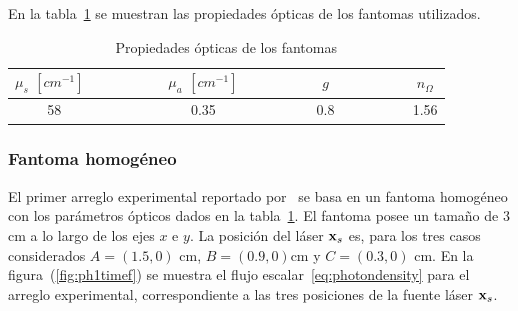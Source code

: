  En la tabla~\ref{tab:tabopt} se muestran las propiedades ópticas 
 de los fantomas utilizados.
 
 \begin{table}[h!]
\caption{Propiedades ópticas de los fantomas}
\vspace{-0.6cm}
\begin{center}
\begin{tabular}{cccc}
\hline
$\mu_s$ $[cm^{-1}]$ ~~~~~~~~ & $\mu_a$ $[cm^{-1}]$ & ~~~~~~~~ $g$  ~~~~~~~~ & $n_{\Omega}$ \\
\hline
58 ~~~~~~~~ & 0.35 & ~~~~~~~~  0.8 ~~~~~~~~ & 1.56 \\
\hline
\end{tabular}
\label{tab:tabopt}
\end{center}
\end{table}

\subsubsection{Fantoma homogéneo}

El primer arreglo experimental reportado por~\cite{Klose2002} 
se basa en un fantoma homogéneo con los parámetros ópticos 
dados en la tabla~\ref{tab:tabopt}. El fantoma posee un tamaño  
de $3$cm a lo largo de los ejes $x$ e $y$. La posición del láser 
   $\mathbf{x}_s$ es, para los tres casos considerados $A=(1.5,0)$ cm, $B=(0.9,0)$cm
    y $C=(0.3,0)$ cm. En la figura~(\ref{fig:ph1timef}) se muestra 
el flujo escalar~\eqref{eq:photondensity} para el arreglo experimental, 
correspondiente a las tres posiciones de la fuente láser $\mathbf{x}_s$. 

